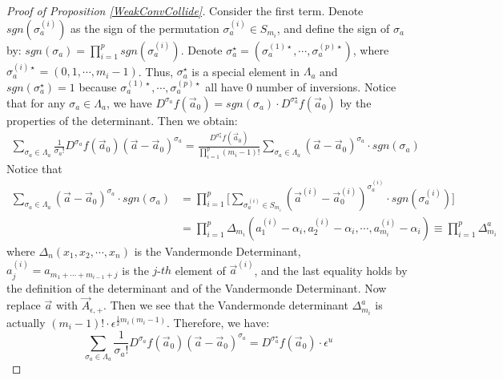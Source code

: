 \begin{proof}[Proof of Proposition \ref{WeakConvCollide}]
Consider the first term. Denote $sgn(\sigma_{a}^{(i)})$ as the sign of the permutation $\sigma_{a}^{(i)}\in S_{m_i}$, and define the sign of $\sigma_{a}$ by: $sgn(\sigma_{a})=\prod_{i=1}^{p}sgn(\sigma_{a}^{(i)})$. Denote $\sigma_{a}^{\star}=(\sigma_{a}^{(1)\star},\cdots,\sigma_{a}^{(p)\star})$, where $\sigma_{a}^{(i)\star}=(0,1,\cdots,m_i-1)$. Thus, $\sigma_{a}^{\star}$ is a special element in $\Lambda_{a}$ and $sgn(\sigma_{a}^{\star})=1$ because $\sigma_{a}^{(1)\star},\cdots,\sigma_{a}^{(p)\star}$ all have $0$ number of inversions. Notice that for any $\sigma_{a}\in\Lambda_{a}$, we have $D^{\sigma_{a}}f(\vec{a}_{0})=sgn(\sigma_{a})\cdot D^{\sigma_{a}^{\star}}f(\vec{a}_{0})$ by the properties of the determinant. Then we obtain:
\begin{align*}
	\sum_{\sigma_{a}\in\Lambda_{a}}\frac{1}{\sigma_{a}!}D^{\sigma_{a}}f(\vec{a}_{0})(\vec{a}-\vec{a}_{0})^{\sigma_{a}}=\frac{D^{\sigma_{a}^{\star}}f(\vec{a}_{0})}{\prod_{i=1}^{p}(m_{i}-1)!}\sum_{\sigma_{a}\in\Lambda_{a}}(\vec{a}-\vec{a}_{0})^{\sigma_{a}}\cdot sgn(\sigma_{a})
\end{align*}
Notice that 
\begin{align*}
	\sum_{\sigma_{a}\in\Lambda_{a}}(\vec{a}-\vec{a}_{0})^{\sigma_{a}}\cdot sgn(\sigma_{a})&=\prod_{i=1}^{p}\Big[\sum_{\sigma_{a}^{(i)}\in S_{m_i}}(\vec{a}^{(i)}-\vec{a}_{0}^{(i)})^{\sigma_{a}^{(i)}}\cdot sgn(\sigma_{a}^{(i)})\Big]\\
	&=\prod_{i=1}^{p}\Delta_{m_i}(a_{1}^{(i)}-\alpha_{i},a_{2}^{(i)}-\alpha_{i},\cdots,a_{m_i}^{(i)}-\alpha_{i})\equiv\prod_{i=1}^{p}\Delta_{m_i}^{a}
\end{align*}
where $\Delta_{n}(x_{1},x_{2},\cdots,x_{n})$ is the Vandermonde Determinant, $a_{j}^{(i)}=a_{m_{1}+\cdots+m_{i-1}+j}$ is the $j$-$th$ element of $\vec{a}^{(i)}$, and the last equality holds by the definition of the determinant and of the Vandermonde Determinant. Now replace $\vec{a}$ with $\vec{A}_{\epsilon,+}$. Then we see that the Vandermonde determinant $\Delta_{m_{i}}^{a}$ is actually $(m_{i}-1)!\cdot\epsilon^{\frac{1}{2}m_{i}(m_{i}-1)}$. Therefore, we have: $$\sum_{\sigma_{a}\in\Lambda_{a}}\frac{1}{\sigma_{a}!}D^{\sigma_{a}}f(\vec{a}_{0})(\vec{a}-\vec{a}_{0})^{\sigma_{a}}=D^{\sigma_{a}^{\star}}f(\vec{a}_{0})\cdot\epsilon^{u}$$


\end{proof}

